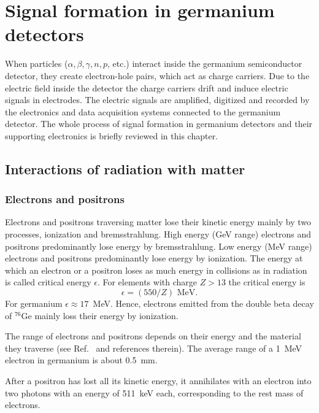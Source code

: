 \chapter{Signal formation in germanium detectors}
\label{cha:detector}
When particles ($\alpha, \beta, \gamma, n, p$, etc.) interact inside
the germanium semiconductor detector, they create electron-hole pairs,
which act as charge carriers. Due to the electric field inside the
detector the charge carriers drift and induce electric signals in
electrodes. The electric signals are amplified, digitized and recorded
by the electronics and data acquisition systems connected to the
germanium detector. The whole process of signal formation in germanium
detectors and their supporting electronics is briefly reviewed in this
chapter.

\section{Interactions of radiation with matter}
\label{sec:det:phys}

\subsection{Electrons and positrons}
\label{sec:det:ep}
Electrons and positrons traversing matter lose their kinetic energy
mainly by two processes, ionization and bremsstrahlung. High energy
(GeV range) electrons and positrons predominantly lose energy by
bremsstrahlung. Low energy (MeV range) electrons and positrons
predominantly lose energy by ionization. The energy at which an
electron or a positron loses as much energy in collisions as in
radiation is called critical energy $\epsilon$. For elements with
charge $Z > 13$ the critical energy is \cite{Ama81}
\begin{equation}
\label{eq:det:ecrit}
\epsilon = (550/Z) \text{ MeV}.
\end{equation}
For germanium $\epsilon \approx 17$~MeV. Hence, electrons emitted from
the double beta decay of $^{76}$Ge mainly loss their energy by
ionization.

The range of electrons and positrons depends on their energy and the
material they traverse (see Ref.~\cite{Bri84} and references
therein). The average range of a 1~MeV electron in germanium is about
0.5~mm.

After a positron has lost all its kinetic energy, it annihilates with
an electron into two photons with an energy of 511~keV each,
corresponding to the rest mass of electrons.

